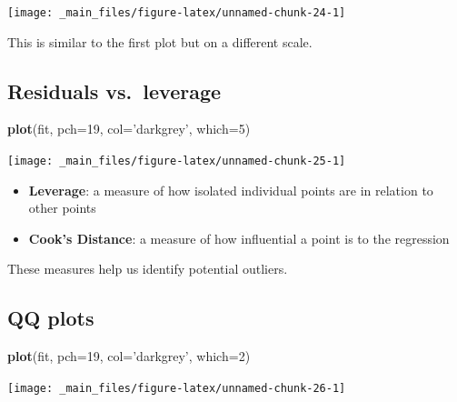 \documentclass[]{book}
\newenvironment{Shaded}{\begin{snugshade}}{\end{snugshade}}
\newcommand{\KeywordTok}[1]{\textcolor[rgb]{0.13,0.29,0.53}{\textbf{#1}}}
\newcommand{\DataTypeTok}[1]{\textcolor[rgb]{0.13,0.29,0.53}{#1}}
\newcommand{\DecValTok}[1]{\textcolor[rgb]{0.00,0.00,0.81}{#1}}
\newcommand{\StringTok}[1]{\textcolor[rgb]{0.31,0.60,0.02}{#1}}
\newcommand{\NormalTok}[1]{#1}
\providecommand{\tightlist}{%
  \setlength{\itemsep}{0pt}\setlength{\parskip}{0pt}}
\theoremstyle{definition}
\theoremstyle{definition}
\theoremstyle{definition}
\theoremstyle{remark}
\begin{document}
\begin{center}\texttt{[image: \_main\_files/figure-latex/unnamed-chunk-24-1]} \end{center}

This is similar to the first plot but on a different scale.

\newpage

\subsection{Residuals vs.~leverage}\label{residuals-vs.leverage}

\begin{Shaded}
\begin{Highlighting}[]
\KeywordTok{plot}\NormalTok{(fit, }\DataTypeTok{pch=}\DecValTok{19}\NormalTok{, }\DataTypeTok{col=}\StringTok{'darkgrey'}\NormalTok{, }\DataTypeTok{which=}\DecValTok{5}\NormalTok{)}
\end{Highlighting}
\end{Shaded}

\begin{center}\texttt{[image: \_main\_files/figure-latex/unnamed-chunk-25-1]} \end{center}

\begin{itemize}
\tightlist
\item
  \textbf{Leverage}: a measure of how isolated individual points are in
  relation to other points
\item
  \textbf{Cook's Distance}: a measure of how influential a point is to
  the regression
\end{itemize}

These measures help us identify potential outliers.

\newpage

\subsection{QQ plots}\label{qq-plots}

\begin{Shaded}
\begin{Highlighting}[]
\KeywordTok{plot}\NormalTok{(fit, }\DataTypeTok{pch=}\DecValTok{19}\NormalTok{, }\DataTypeTok{col=}\StringTok{'darkgrey'}\NormalTok{, }\DataTypeTok{which=}\DecValTok{2}\NormalTok{)}
\end{Highlighting}
\end{Shaded}

\begin{center}\texttt{[image: \_main\_files/figure-latex/unnamed-chunk-26-1]} \end{center}
\end{document}
